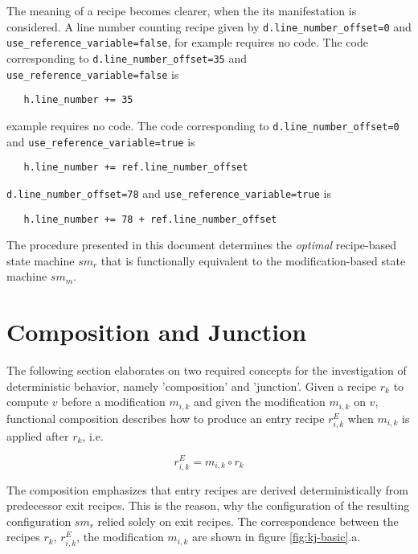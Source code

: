 \documentclass[12pt,a4paper]{scrartcl}
\begin{document}
The meaning of a recipe becomes clearer, when the its manifestation is
considered.  A line number counting recipe given by
\verb|d.line_number_offset=0| and \verb|use_reference_variable=false|, for
example requires no code. The code corresponding to 
\verb|d.line_number_offset=35| and \verb|use_reference_variable=false| is
\begin{verbatim}
   h.line_number += 35
\end{verbatim}
example requires no code. The code corresponding to 
\verb|d.line_number_offset=0| and \verb|use_reference_variable=true| is
\begin{verbatim}
   h.line_number += ref.line_number_offset 
\end{verbatim}
\verb|d.line_number_offset=78| and \verb|use_reference_variable=true| is
\begin{verbatim}
   h.line_number += 78 + ref.line_number_offset
\end{verbatim}

The procedure presented in this document determines the \textit{optimal}
recipe-based state machine $sm_r$ that is functionally equivalent to the
modification-based state machine $sm_m$.

%
\section{Composition and Junction}

The following section elaborates on two required concepts for the investigation
of deterministic behavior, namely 'composition' and 'junction'.  Given a recipe
$r_k$ to compute $v$ before a modification $m_{i,k}$ and given the modification
$m_{i,k}$ on $v$, functional composition describes how to produce an entry recipe
$r^E_{i,k}$ when $m_{i,k}$ is applied after $r_k$, i.e.

\begin{equation} \label{eq:composition}
    r^E_{i,k} = m_{i,k} \circ r_k
\end{equation}

The composition emphasizes that entry recipes are derived deterministically
from predecessor exit recipes. This is the reason, why the configuration of the resulting
configuration $sm_r$ relied solely on exit recipes.  The correspondence
between the recipes $r_k$, $r^E_{i,k}$, the modification $m_{i,k}$
are shown in figure \ref{fig:kj-basic}.a.  
\end{document}
